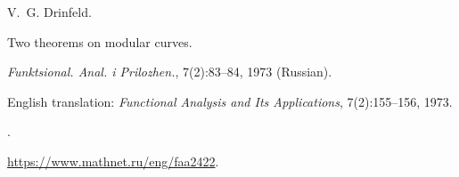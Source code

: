 V.~G. Drinfeld.

\newblock Two theorems on modular curves.

\newblock \emph{Funktsional. Anal. i Prilozhen.}, 7(2):83--84, 1973 (Russian).

\newblock English translation: \emph{Functional Analysis and Its Applications}, 7(2):155--156, 1973.

\newblock {}.

\newblock \url{https://www.mathnet.ru/eng/faa2422}.

